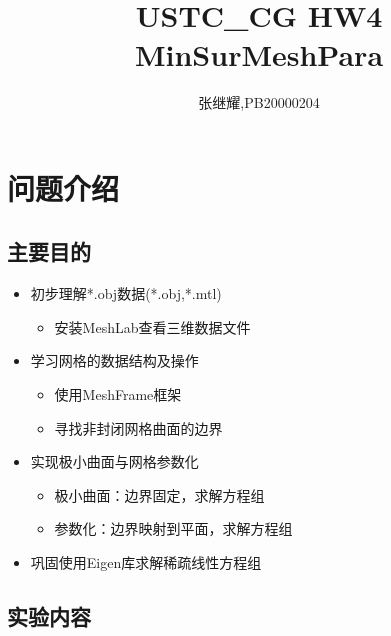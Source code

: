 \documentclass{article}
\title{USTC\_CG HW4 MinSurMeshPara}
\author{张继耀,PB20000204}
\begin{document}
	\maketitle
	
	\tableofcontents
	
	\section {问题介绍}
	\subsection{主要目的}
	
	\begin{itemize}
		\item 初步理解*.obj数据(*.obj,*.mtl)
		  \begin{itemize}[label=$\circ$, itemjoin=\hspace{0.5em}]
			\item 安装MeshLab查看三维数据文件
		\end{itemize}
	\end{itemize}
	
	\begin{itemize}
		\item 学习网格的数据结构及操作
		  \begin{itemize}[label=$\circ$, itemjoin=\hspace{0.5em}]
			\item 使用MeshFrame框架
		    \item 寻找非封闭网格曲面的边界
		\end{itemize}
	\end{itemize}
	
	\begin{itemize}
	\item 实现极小曲面与网格参数化
	\begin{itemize}[label=$\circ$, itemjoin=\hspace{0.5em}]
		\item 极小曲面：边界固定，求解方程组
		\item 参数化：边界映射到平面，求解方程组
	\end{itemize}
\end{itemize}
	
	\begin{itemize}
		\item 巩固使用Eigen库求解稀疏线性方程组
	\end{itemize}

    \subsection{实验内容}
    
\end{document}
